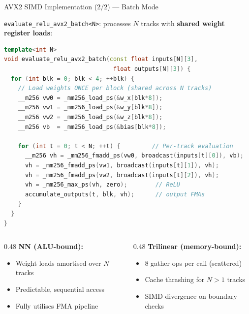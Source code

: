 \documentclass[aspectratio=169, 11pt]{beamer}
\begin{document}
\begin{frame}[fragile]{AVX2 SIMD Implementation (2/2) --- Batch Mode}

\texttt{evaluate\_relu\_avx2\_batch<N>}: processes $N$ tracks with
\textbf{shared weight register loads}:

\begin{lstlisting}[language=C++, title={\scriptsize Batch pseudo-code}]
template<int N>
void evaluate_relu_avx2_batch(const float inputs[N][3],
                               float outputs[N][3]) {
  for (int blk = 0; blk < 4; ++blk) {
    // Load weights ONCE per block (shared across N tracks)
    __m256 vw0 = _mm256_load_ps(&w_x[blk*8]);
    __m256 vw1 = _mm256_load_ps(&w_y[blk*8]);
    __m256 vw2 = _mm256_load_ps(&w_z[blk*8]);
    __m256 vb  = _mm256_load_ps(&bias[blk*8]);

    for (int t = 0; t < N; ++t) {         // Per-track evaluation
      __m256 vh = _mm256_fmadd_ps(vw0, broadcast(inputs[t][0]), vb);
      vh = _mm256_fmadd_ps(vw1, broadcast(inputs[t][1]), vh);
      vh = _mm256_fmadd_ps(vw2, broadcast(inputs[t][2]), vh);
      vh = _mm256_max_ps(vh, zero);        // ReLU
      accumulate_outputs(t, blk, vh);      // output FMAs
    }
  }
}
\end{lstlisting}

\vspace{2pt}
\begin{columns}[T]
\begin{column}{0.48\textwidth}
  \textbf{NN (ALU-bound):}
  \begin{itemize}\scriptsize
    \item Weight loads amortised over $N$ tracks
    \item Predictable, sequential access
    \item Fully utilises FMA pipeline
  \end{itemize}
\end{column}
\begin{column}{0.48\textwidth}
  \textbf{Trilinear (memory-bound):}
  \begin{itemize}\scriptsize
    \item 8 gather ops per call (scattered)
    \item Cache thrashing for $N > 1$ tracks
    \item SIMD divergence on boundary checks
  \end{itemize}
\end{column}
\end{columns}
\end{frame}
\end{document}
